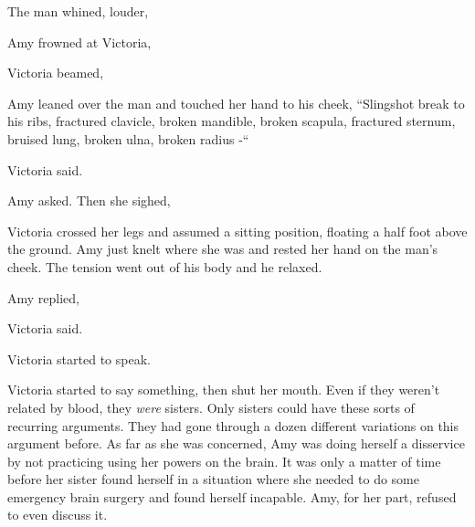 The man whined, louder, 

Amy frowned at Victoria, 

Victoria beamed, 

Amy leaned over the man and touched her hand to his cheek, “Slingshot break to his ribs, fractured clavicle, broken mandible, broken scapula, fractured sternum, bruised lung, broken ulna, broken radius -“

 Victoria said.

 Amy asked. Then she sighed, 

Victoria crossed her legs and assumed a sitting position, floating a half foot above the ground. Amy just knelt where she was and rested her hand on the man's cheek. The tension went out of his body and he relaxed.


 Amy replied, 

 Victoria said.


 Victoria started to speak.


Victoria started to say something, then shut her mouth. Even if they weren't related by blood, they {\em were} sisters. Only sisters could have these sorts of recurring arguments. They had gone through a dozen different variations on this argument before. As far as she was concerned, Amy was doing herself a disservice by not practicing using her powers on the brain. It was only a matter of time before her sister found herself in a situation where she needed to do some emergency brain surgery and found herself incapable. Amy, for her part, refused to even discuss it.

